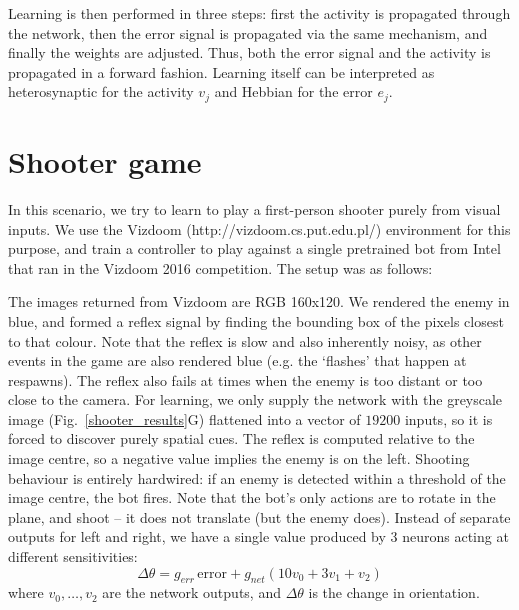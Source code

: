 \documentclass{aamas2017}
\begin{document}
Learning is then performed in three steps: first the activity is
propagated through the network, then the error signal is propagated
via the same mechanism, and finally the weights are adjusted. Thus,
both the error signal and the activity is propagated in a forward
fashion. Learning itself can be interpreted as heterosynaptic for the
activity $v_j$ and Hebbian for the error $e_j$.

\section{Shooter game}
In this scenario, we try to learn to play a first-person shooter
purely from visual inputs. We use the Vizdoom
(http://vizdoom.cs.put.edu.pl/) environment for this purpose, and
train a controller to play against a single pretrained bot from Intel
that ran in the Vizdoom 2016 competition. The setup was as follows:

The images returned from Vizdoom are RGB 160x120. We rendered the
enemy in blue, and formed a reflex signal by finding the bounding box
of the pixels closest to that colour. Note that the reflex is slow and
also inherently noisy, as other events in the game are also rendered
blue (e.g. the ‘flashes’ that happen at respawns). The reflex also
fails at times when the enemy is too distant or too close to the
camera. For learning, we only supply the network with the greyscale
image (Fig.~\ref{shooter_results}G) flattened into a vector of $19200$
inputs, so it is forced to discover purely spatial cues. The reflex is
computed relative to the image centre, so a negative value implies the
enemy is on the left. Shooting behaviour is entirely hardwired: if an
enemy is detected within a threshold of the image centre, the bot
fires. Note that the bot's only actions are to rotate in the plane,
and shoot -- it does not translate (but the enemy does). Instead of
separate outputs for left and right, we have a single value produced
by 3 neurons acting at different sensitivities:
\begin{equation}
\Delta \theta = g_{err}\, \mathrm{error} + g_{net} \left( 10 v_0 + 3 v_1 + v_2 \right)
\end{equation}
where $v_0, \ldots, v_2$ are the network outputs, and $\Delta \theta$
is the change in orientation.
\end{document}
